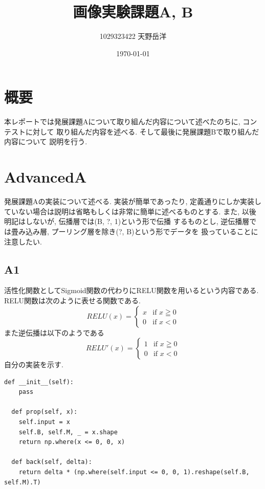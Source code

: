 \documentclass[a4paper,11pt]{jsarticle}
\begin{document}
\title{画像実験課題A, B}
\author{1029323422 天野岳洋}
\date{\today}
\maketitle
\clearpage

\section{概要}
本レポートでは発展課題Aについて取り組んだ内容について述べたのちに, コンテストに対して
取り組んだ内容を述べる. そして最後に発展課題Bで取り組んだ内容について
説明を行う.
\section{AdvancedA}
発展課題Aの実装について述べる. 実装が簡単であったり,
定義通りにしか実装していない場合は説明は省略もしくは非常に簡単に述べるものとする.
また, 以後明記はしないが, 伝播層では(B, ?, 1)という形で伝播
するものとし, 逆伝播層では畳み込み層, プーリング層を除き(?, B)という形でデータを
扱っていることに注意したい.
\subsection{A1}
活性化関数としてSigmoid関数の代わりにRELU関数を用いるという内容である.
RELU関数は次のように表せる関数である.
\begin{equation}
  RELU(x)=
  \begin{cases}
    x & \text{if $x \geqq 0$} \\
    0 & \text{if $x < 0$}
  \end{cases}
\end{equation}
また逆伝播は以下のようである
\begin{equation}
  RELU'(x) =
  \begin{cases}
    1 & \text{if $x \geqq 0$} \\
    0 & \text{if $x < 0$}
  \end{cases}
\end{equation}
自分の実装を示す.
\begin{lstlisting}[caption=RELU]
  def __init__(self):
    pass

  def prop(self, x):
    self.input = x
    self.B, self.M, _ = x.shape
    return np.where(x <= 0, 0, x)
    
  def back(self, delta):
    return delta * (np.where(self.input <= 0, 0, 1).reshape(self.B, self.M).T)
\end{lstlisting}
\end{document}
